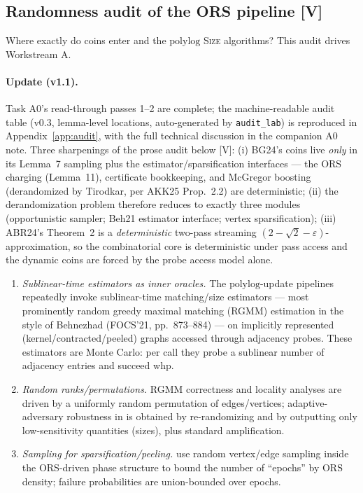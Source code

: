 \documentclass[11pt]{article}
\theoremstyle{definition}
\theoremstyle{remark}
\newcommand{\statusV}{\textcolor{green!45!black}{\textsf{[V]}}}
\newcommand{\ORS}{\mathrm{ORS}}
\newcommand{\polylog}{\mathrm{polylog}}
\newcommand{\eps}{\varepsilon}
\begin{document}
\subsection{Randomness audit of the ORS pipeline \statusV}
\label{sec:audit}

Where exactly do coins enter \cite{BG24,AKK25} and the $\polylog$
\textsc{Size} algorithms? This audit drives Workstream A.

\paragraph{Update (v1.1).} Task A0's read-through passes 1--2 are
complete; the machine-readable audit table (v0.3, lemma-level
locations, auto-generated by \texttt{audit\_lab}) is reproduced in
Appendix~\ref{app:audit}, with the full technical discussion in the
companion A0 note. Three sharpenings of the prose audit below
\statusV{}: (i) BG24's coins live \emph{only} in its Lemma~7 sampling
plus the estimator/sparsification interfaces --- the ORS charging
(Lemma~11), certificate bookkeeping, and McGregor boosting
(derandomized by Tirodkar, per AKK25 Prop.~2.2) are deterministic;
(ii) the derandomization problem therefore reduces to exactly three
modules (opportunistic sampler; Beh21 estimator interface; vertex
sparsification); (iii) ABR24's Theorem~2 is a \emph{deterministic}
two-pass streaming $(2-\sqrt2-\eps)$-approximation, so the
combinatorial core is deterministic under pass access and the dynamic
coins are forced by the probe access model alone.

\begin{enumerate}[itemsep=2pt]
\item \emph{Sublinear-time estimators as inner oracles.} The
$\polylog$-update pipelines \cite{BKSW23,Beh23,ABR24} repeatedly invoke
sublinear-time matching/size estimators --- most prominently random
greedy maximal matching (RGMM) estimation in the style of Behnezhad
\cite{Beh21} (FOCS'21, pp.~873--884) --- on implicitly represented
(kernel/contracted/peeled) graphs accessed through adjacency probes.
These estimators are Monte Carlo: per call they probe a sublinear number
of adjacency entries and succeed whp.
\item \emph{Random ranks/permutations.} RGMM correctness and locality
analyses are driven by a uniformly random permutation of edges/vertices;
adaptive-adversary robustness in \cite{BKSW23,AKK25} is obtained by
re-randomizing and by outputting only low-sensitivity quantities (sizes),
plus standard amplification.
\item \emph{Sampling for sparsification/peeling.} \cite{BG24,AKK25} use
random vertex/edge sampling inside the ORS-driven phase structure to
bound the number of ``epochs'' by $\ORS$ density; failure probabilities
are union-bounded over epochs.
\end{enumerate}
\end{document}
